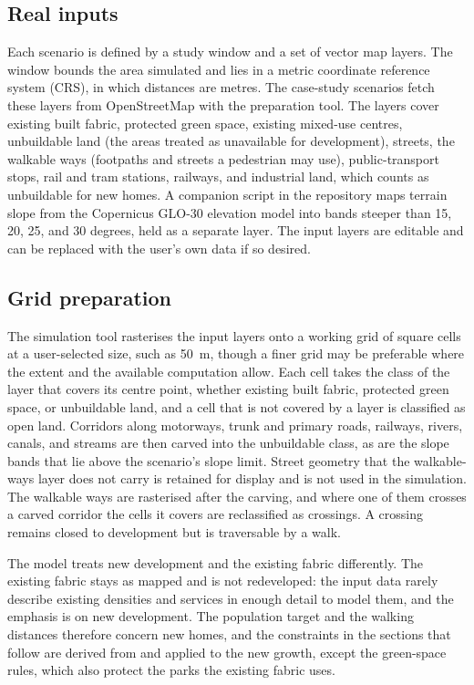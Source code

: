 \documentclass[11pt]{article}
\begin{document}
\subsection{Real inputs}
\label{sec:inputs}

Each scenario is defined by a study window and a set of vector map
layers. The window bounds the area simulated and lies in a metric
coordinate reference system (CRS), in which distances are metres. The case-study scenarios
fetch these layers from OpenStreetMap
\citep{osm} with the preparation tool. The layers cover existing
built fabric, protected green space, existing mixed-use centres,
unbuildable land (the areas treated as unavailable for development),
streets, the walkable ways (footpaths and streets a pedestrian may
use), public-transport stops, rail and tram stations,
railways, and industrial land, which counts as unbuildable for new
homes. A companion script in the repository maps terrain slope from the Copernicus GLO-30 elevation model \citep{copernicus_glo30} into bands steeper than 15, 20, 25, and 30 degrees, held as a separate layer. The input layers are editable and can be replaced with the user's own data if so desired.

\subsection{Grid preparation}
\label{sec:gridprep}

The simulation tool rasterises the input layers onto a working grid
of square cells at a user-selected size, such as 50~m, though a finer grid may be
preferable where the extent and the available computation allow. Each cell takes the class of the layer that covers its centre point, whether existing built fabric, protected green space, or unbuildable land, and a cell that is not covered by a layer is classified as open land. Corridors along motorways, trunk and primary roads, railways, rivers, canals, and streams are then carved into the unbuildable class, as are the slope bands that lie above the scenario's slope limit. Street geometry that the walkable-ways layer does not carry is retained for display and is not used in the simulation. The walkable ways are rasterised after the carving, and where one of them crosses a carved corridor the cells it covers are reclassified as crossings. A crossing remains closed to development but is traversable by a walk.

The model treats new development and the existing fabric differently.
The existing fabric stays as mapped and is not redeveloped: the
input data rarely describe existing densities and services in
enough detail to model them, and the emphasis is on new
development. The population target and the walking distances
therefore concern new homes, and the constraints in the sections
that follow are derived from and applied to the new growth, except
the green-space rules, which also protect the parks the existing
fabric uses.
\end{document}
